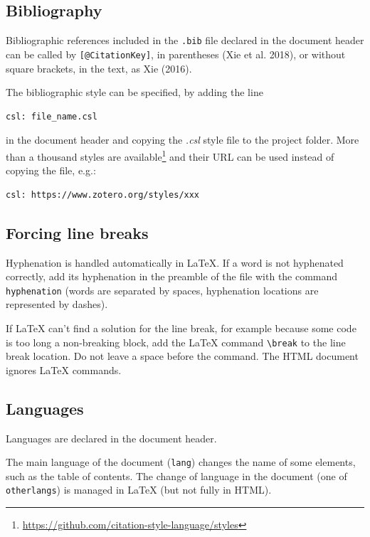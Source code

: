 \documentclass[
  french,
  british,
  11pt,
]{stylisharticle}
\begin{document}
\subsection{Bibliography}\label{bibliography}

Bibliographic references included in the \texttt{.bib} file declared in
the document header can be called by \texttt{{[}@CitationKey{]}}, in
parentheses (Xie et al. 2018), or without square brackets, in the text,
as Xie (2016).

The bibliographic style can be specified, by adding the line

\begin{verbatim}
csl: file_name.csl
\end{verbatim}

in the document header and copying the \emph{.csl} style file to the
project folder. More than a thousand styles are available\footnote{\url{https://github.com/citation-style-language/styles}}
and their URL can be used instead of copying the file, e.g.:

\begin{verbatim}
csl: https://www.zotero.org/styles/xxx
\end{verbatim}

\subsection{Forcing line breaks}\label{forcing-line-breaks}

Hyphenation is handled automatically in LaTeX. If a word is not
hyphenated correctly, add its hyphenation in the preamble of the file
with the command \texttt{hyphenation} (words are separated by spaces,
hyphenation locations are represented by dashes).

If LaTeX can't find a solution for the line break, for example because
some code is too long a non-breaking block, add the LaTeX command
\texttt{\textbackslash{}break} to the line break location. Do not leave
a space before the command. The HTML document ignores LaTeX commands.

\subsection{Languages}\label{languages}

Languages are declared in the document header.

The main language of the document (\texttt{lang}) changes the name of
some elements, such as the table of contents. The change of language in
the document (one of \texttt{otherlangs}) is managed in LaTeX (but not
fully in HTML).
\end{document}
